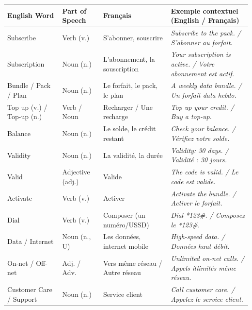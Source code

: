 \documentclass[11pt]{article}
\newcommand{\cle}[1]{{\popxbold\color{popdark}#1}}
\newcommand{\eng}[1]{\ifmmode\text{\textit{#1}}\else\begingroup\selectlanguage{english}\itshape #1\endgroup\fi}
\begin{document}
\begin{center}
\begin{tabularx}{\linewidth}{|l|l|l|X|}\hline
\rowcolor{popblueL} \textbf{English Word} & \textbf{Part of Speech} & \textbf{Français} & \textbf{Exemple contextuel (English / Français)} \\ \hline
\cle{Subscribe} & Verb (v.) & S'abonner, souscrire & \eng{Subscribe to the pack.} / S'abonner au forfait. \\ \hline
\cle{Subscription} & Noun (n.) & L'abonnement, la souscription & \eng{Your subscription is active.} / Votre abonnement est actif. \\ \hline
\cle{Bundle} / \cle{Pack} / \cle{Plan} & Noun (n.) & Le forfait, le pack, le plan & \eng{A weekly data bundle.} / Un forfait data hebdo. \\ \hline
\cle{Top up} (v.) / \cle{Top-up} (n.) & Verb / Noun & Recharger / Une recharge & \eng{Top up your credit.} / \eng{Buy a top-up.} \\ \hline
\cle{Balance} & Noun (n.) & Le solde, le crédit restant & \eng{Check your balance.} / Vérifiez votre solde. \\ \hline
\cle{Validity} & Noun (n.) & La validité, la durée & \eng{Validity: 30 days.} / Validité : 30 jours. \\ \hline
\cle{Valid} & Adjective (adj.) & Valide & \eng{The code is valid.} / Le code est valide. \\ \hline
\cle{Activate} & Verb (v.) & Activer & \eng{Activate the bundle.} / Activer le forfait. \\ \hline
\cle{Dial} & Verb (v.) & Composer (un numéro/USSD) & \eng{Dial *123\#.} / Composez le *123\#. \\ \hline
\cle{Data} / \cle{Internet} & Noun (n., U) & Les données, internet mobile & \eng{High-speed data.} / Données haut débit. \\ \hline
\cle{On-net} / \cle{Off-net} & Adj. / Adv. & Vers même réseau / Autre réseau & \eng{Unlimited on-net calls.} / Appels illimités même réseau. \\ \hline
\cle{Customer Care} / \cle{Support} & Noun (n.) & Service client & \eng{Call customer care.} / Appelez le service client. \\ \hline
\end{tabularx}
\end{center}
\end{document}
